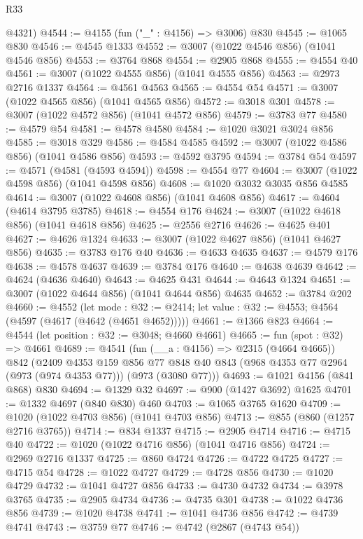 \begin{lexlean}{R33}
\begin{coremodule}
      @4321)
@4544 := @4155 (fun ("_" : @4156) => @3006) @830
@4545 := @1065 @830
@4546 := @4545 @1333
@4552 := @3007 (@1022 @4546 @856) (@1041 @4546 @856)
@4553 := @3764 @868
@4554 := @2905 @868
@4555 := @4554 @40
@4561 := @3007 (@1022 @4555 @856) (@1041 @4555 @856)
@4563 := @2973 @2716 @1337
@4564 := @4561 @4563
@4565 := @4554 @54
@4571 := @3007 (@1022 @4565 @856) (@1041 @4565 @856)
@4572 := @3018 @301
@4578 := @3007 (@1022 @4572 @856) (@1041 @4572 @856)
@4579 := @3783 @77
@4580 := @4579 @54
@4581 := @4578 @4580
@4584 := @1020 @3021 @3024 @856
@4585 := @3018 @329
@4586 := @4584 @4585
@4592 := @3007 (@1022 @4586 @856) (@1041 @4586 @856)
@4593 := @4592 @3795
@4594 := @3784 @54
@4597 := @4571 (@4581 (@4593 @4594))
@4598 := @4554 @77
@4604 := @3007 (@1022 @4598 @856) (@1041 @4598 @856)
@4608 := @1020 @3032 @3035 @856 @4585
@4614 := @3007 (@1022 @4608 @856) (@1041 @4608 @856)
@4617 := @4604 (@4614 @3795 @3785)
@4618 := @4554 @176
@4624 := @3007 (@1022 @4618 @856) (@1041 @4618 @856)
@4625 := @2556 @2716
@4626 := @4625 @401
@4627 := @4626 @1324
@4633 := @3007 (@1022 @4627 @856) (@1041 @4627 @856)
@4635 := @3783 @176 @40
@4636 := @4633 @4635
@4637 := @4579 @176
@4638 := @4578 @4637
@4639 := @3784 @176
@4640 := @4638 @4639
@4642 := @4624 (@4636 @4640)
@4643 := @4625 @431
@4644 := @4643 @1324
@4651 := @3007 (@1022 @4644 @856) (@1041 @4644 @856) @4635
@4652 := @3784 @202
@4660 := @4552
    (let mode : @32 := @2414; let value : @32 := @4553; @4564 (@4597 (@4617 (@4642 (@4651 @4652)))))
@4661 := @1366 @823
@4664 := @4544 (let position : @32 := @3048; @4660 @4661)
@4665 := fun (spot : @32) => @4661
@4689 := @4541
    (fun (__a : @4156) => @2315 (@4664 @4665))
    @842
    (@2409
      @4353
      @159
      @856
      @77
      @848
      @40
      @843
      (@968 @4353 @77 @2964 (@973 (@974 @4353 @77)))
      (@973 (@3080 @77)))
@4693 := @1021 @4156 (@841 @868) @830
@4694 := @1329 @32
@4697 := @900 (@1427 @3692) @1625
@4701 := @1332 @4697 (@840 @830) @460
@4703 := @1065 @3765 @1620
@4709 := @1020 (@1022 @4703 @856) (@1041 @4703 @856)
@4713 := @855 (@860 (@1257 @2716 @3765))
@4714 := @834 @1337
@4715 := @2905 @4714
@4716 := @4715 @40
@4722 := @1020 (@1022 @4716 @856) (@1041 @4716 @856)
@4724 := @2969 @2716 @1337
@4725 := @860 @4724
@4726 := @4722 @4725
@4727 := @4715 @54
@4728 := @1022 @4727
@4729 := @4728 @856
@4730 := @1020 @4729
@4732 := @1041 @4727 @856
@4733 := @4730 @4732
@4734 := @3978 @3765
@4735 := @2905 @4734
@4736 := @4735 @301
@4738 := @1022 @4736 @856
@4739 := @1020 @4738
@4741 := @1041 @4736 @856
@4742 := @4739 @4741
@4743 := @3759 @77
@4746 := @4742 (@2867 (@4743 @54))

\end{coremodule}
\end{lexlean}
